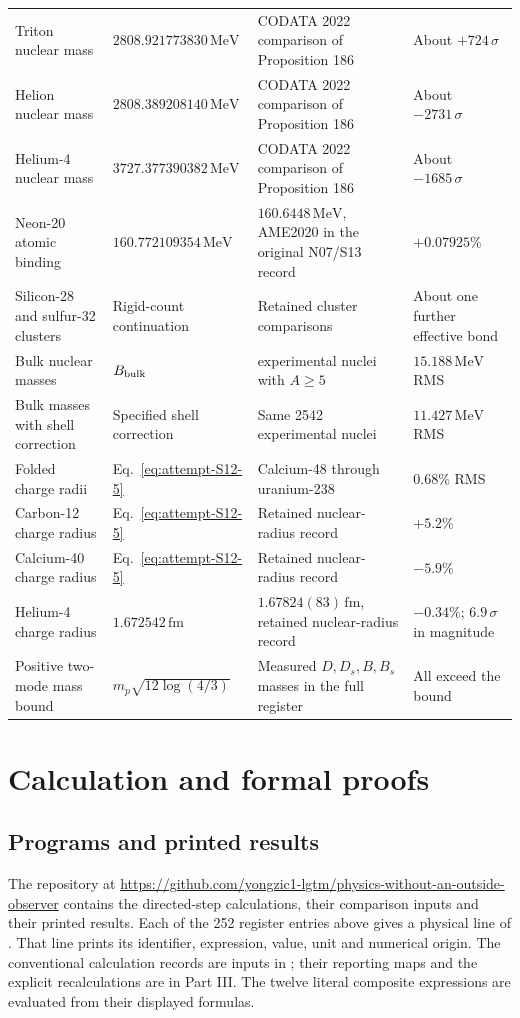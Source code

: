 \documentclass[aps,prx,onecolumn,10pt,notitlepage,nofootinbib,longbibliography]{revtex4-2}
\numberwithin{equation}{section}
\numberwithin{table}{section}
\newcommand{\MeV}{\,\mathrm{MeV}}
\newcommand{\fm}{\,\mathrm{fm}}
\begin{document}
\begin{longtable}{@{}>{\raggedright\arraybackslash}p{}>{\raggedright\arraybackslash}p{}>{\raggedright\arraybackslash}p{}>{\raggedright\arraybackslash}p{}@{}}
Triton nuclear mass&$2808.921773830\MeV$&CODATA 2022 comparison of Proposition 186&About $+724\,\sigma$\\[5pt]
Helion nuclear mass&$2808.389208140\MeV$&CODATA 2022 comparison of Proposition 186&About $-2731\,\sigma$\\[5pt]
Helium-4 nuclear mass&$3727.377390382\MeV$&CODATA 2022 comparison of Proposition 186&About $-1685\,\sigma$\\[5pt]
Neon-20 atomic binding&$160.772109354\MeV$&$160.6448\MeV$, AME2020 in the original N07/S13 record&$+0.07925\%$\\[5pt]
Silicon-28 and sulfur-32 clusters&Rigid-count continuation&Retained cluster comparisons&About one further effective bond\\[5pt]
Bulk nuclear masses&$B_{\rm bulk}$&2542 experimental nuclei with $A\ge5$&$15.188\MeV$ RMS\\[5pt]
Bulk masses with shell correction&Specified shell correction&Same 2542 experimental nuclei&$11.427\MeV$ RMS\\[5pt]
Folded charge radii&Eq.~\eqref{eq:attempt-S12-5}&Calcium-48 through uranium-238&$0.68\%$ RMS\\[5pt]
Carbon-12 charge radius&Eq.~\eqref{eq:attempt-S12-5}&Retained nuclear-radius record&$+5.2\%$\\[5pt]
Calcium-40 charge radius&Eq.~\eqref{eq:attempt-S12-5}&Retained nuclear-radius record&$-5.9\%$\\[5pt]
Helium-4 charge radius&$1.672542\fm$&$1.67824(83)\fm$, retained nuclear-radius record&$-0.34\%$; $6.9\,\sigma$ in magnitude\\[5pt]
Positive two-mode mass bound&$m_p\sqrt{12\log(4/3)}$&Measured $D,D_s,B,B_s$ masses in the full register&All exceed the bound\\
\end{longtable}
\endgroup

\section{Calculation and formal proofs}
\label{sec:provenance}

\subsection{Programs and printed results}
\label{sec:programrecord}

The repository at \url{https://github.com/yongzic1-lgtm/physics-without-an-outside-observer} contains the directed-step
calculations, their comparison inputs and their printed results. Each of the
252 register entries above gives a physical line of
. That line prints its identifier, expression,
value, unit and numerical origin. The conventional calculation records are
inputs in ; their reporting maps and the explicit recalculations
are in Part III. The twelve literal composite expressions are evaluated
from their displayed formulas.
\end{document}
